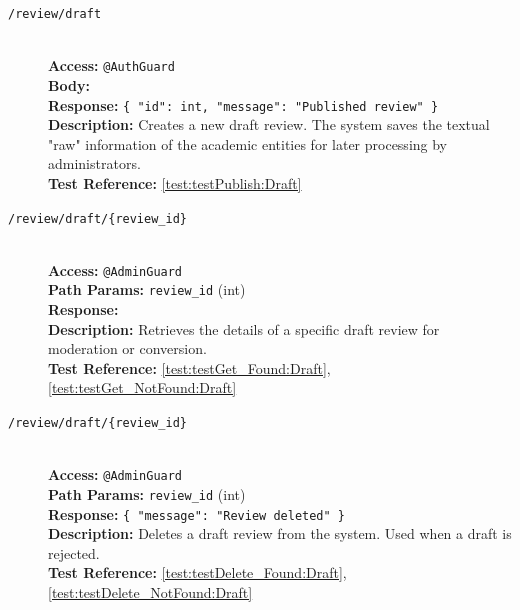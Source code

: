 \begin{description}
	\item[\POST \quad \texttt{/review/draft}] \hfill \\
	\textbf{Access:} \texttt{@AuthGuard} \\
	\textbf{Body:} \texttt{} \\
	\textbf{Response:} \texttt{\{ "id": int, "message": "Published review" \}} \\
	\textbf{Description:} Creates a new draft review. The system saves the textual "raw" information of the academic entities for later processing by administrators.\\
	\textbf{Test Reference:} \ref{test:testPublish:Draft}
	
	\item[\GET \quad \texttt{/review/draft/\{review\_id\}}] \hfill \\
	\textbf{Access:} \texttt{@AdminGuard} \\
	\textbf{Path Params:} \texttt{review\_id} (int) \\
	\textbf{Response:} \texttt{} \\
	\textbf{Description:} Retrieves the details of a specific draft review for moderation or conversion.\\
	\textbf{Test Reference:} \ref{test:testGet_Found:Draft}, \ref{test:testGet_NotFound:Draft}
	
	\item[\DELETE \quad \texttt{/review/draft/\{review\_id\}}] \hfill \\
	\textbf{Access:} \texttt{@AdminGuard} \\
	\textbf{Path Params:} \texttt{review\_id} (int) \\
	\textbf{Response:} \texttt{\{ "message": "Review deleted" \}} \\
	\textbf{Description:} Deletes a draft review from the system. Used when a draft is rejected.\\
	\textbf{Test Reference:} \ref{test:testDelete_Found:Draft}, \ref{test:testDelete_NotFound:Draft}
	

\end{description}
